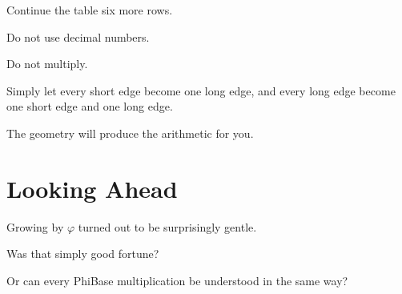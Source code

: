 Continue the table six more rows.

Do not use decimal numbers.

Do not multiply.

Simply let every short edge become one long edge, and every long edge become one short edge and one long edge.

The geometry will produce the arithmetic for you.

\section*{Looking Ahead}

Growing by \(\varphi\) turned out to be surprisingly gentle.

Was that simply good fortune?

Or can every PhiBase multiplication be understood in the same way?
